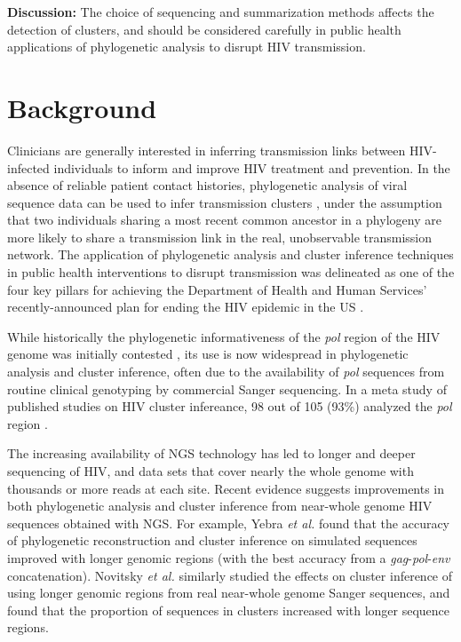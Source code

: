 \documentclass[letterpaper]{article}
\begin{document}
\textbf{Discussion:} The choice of sequencing and summarization methods affects the detection of clusters, and should be considered carefully in public health applications of phylogenetic analysis to disrupt HIV transmission.

\section*{Background}

Clinicians are generally interested in inferring transmission links between HIV-infected individuals to inform and improve HIV treatment and prevention. In the absence of reliable patient contact histories, phylogenetic analysis of viral sequence data can be used to infer transmission clusters \parencite{leitner}, under the assumption that two individuals sharing a most recent common ancestor in a phylogeny are more likely to share a transmission link in the real, unobservable transmission network. The application of phylogenetic analysis and cluster inference techniques in public health interventions to disrupt transmission was delineated as one of the four key pillars for achieving the Department of Health and Human Services' recently-announced plan for ending the HIV epidemic in the US \parencite{fauci}.

While historically the phylogenetic informativeness of the \emph{pol} region of the HIV genome was initially contested \parencite{hue, sturmer}, its use is now widespread in phylogenetic analysis and cluster inference, often due to the availability of \emph{pol} sequences from routine clinical genotyping by commercial Sanger sequencing. In a meta study of published studies on HIV cluster infereance, 98 out of 105 (93\%) analyzed the \emph{pol} region \cite{hassan}.

The increasing availability of NGS technology has led to longer and deeper sequencing of HIV, and data sets that cover nearly the whole genome with thousands or more reads at each site. Recent evidence suggests improvements in both phylogenetic analysis and cluster inference from near-whole genome HIV sequences obtained with NGS. For example, Yebra \emph{et al.} \parencite{yebra} found that the accuracy of phylogenetic reconstruction and cluster inference on simulated sequences improved with longer genomic regions (with the best accuracy from a \emph{gag}-\emph{pol}-\emph{env} concatenation). Novitsky \emph{et al.} \parencite{novitsky} similarly studied the effects on cluster inference of using longer genomic regions from real near-whole genome Sanger sequences, and found that the proportion of sequences in clusters increased with longer sequence regions.
\end{document}
